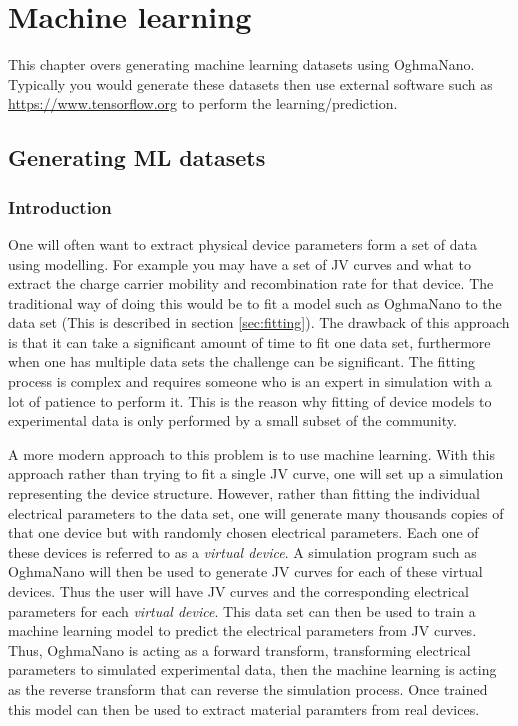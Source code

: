 \newpage
\chapter{Machine learning}
This chapter overs generating machine learning datasets using OghmaNano. Typically you would generate these datasets then use external software such as \href{https://www.tensorflow.org/}{https://www.tensorflow.org} to perform the learning/prediction.
  
\section{Generating ML datasets}
\label{sec:machine_learning}
\subsection{Introduction}
One will often want to extract physical device parameters form a set of data using modelling. For example you may have a set of JV curves and what to extract the charge carrier mobility and recombination rate for that device.  The traditional way of doing this would be to fit a model such as OghmaNano to the data set (This is described in section \ref{sec:fitting}).  The drawback of this approach is that it can take a significant amount of time to fit one data set, furthermore when one has multiple data sets the challenge can be significant. The fitting process is complex and requires someone who is an expert in simulation with a lot of patience to perform it. This is the reason why fitting of device models to experimental data is only performed by a small subset of the community. 

A more modern approach to this problem is to use machine learning. With this approach rather than trying to fit a single JV curve, one will set up a simulation representing the device structure. However, rather than fitting the individual electrical parameters to the data set, one will generate many thousands copies of that one device but with randomly chosen electrical parameters. Each one of these devices is referred to as a \emph{virtual device}. A simulation program such as OghmaNano will then be used to generate JV curves for each of these virtual devices. Thus the user will have JV curves and the corresponding electrical parameters for each \emph{virtual device}. This data set can then be used to train a machine learning model to predict the electrical parameters from JV curves. Thus, OghmaNano is acting as a forward transform, transforming electrical parameters to simulated experimental data, then the machine learning is acting as the reverse transform that can reverse the simulation process.  Once trained this model can then be used to extract material paramters from real devices.

